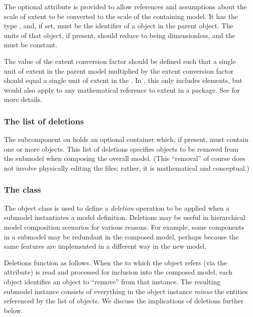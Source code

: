 The optional  attribute is provided to allow
references and assumptions about the scale of extent to be converted to 
the scale of the containing model.  It has the type ,
and, if set, must be the identifier of a \Parameter object in the 
parent \Model object.  The units of that \Parameter object, if present,
should reduce to being dimensionless, and the \Parameter must be constant.

The value of the extent conversion factor should be defined such that a
single unit of extent in the parent model multiplied by the extent conversion
factor should equal a single unit of extent in the \Submodel. 
In \sbmlthreecore, this only
includes \KineticLaw elements, but would also apply to any mathematical 
reference to extent in a package. See  for more details.


\subsubsection{The list of deletions}
\label{listofdeletions}

The  subcomponent on \Submodel holds an optional
\ListOfDeletions container which, if present, must contain one or more
\Deletion objects.  This list of deletions specifies objects to be
removed from the submodel when composing the overall model.  (This
``removal'' of course does not involve physically editing the files;
rather, it is mathematical and conceptual.)


\subsubsection{The  class}
\label{deletion-class}

The \Deletion object class is used to define a \emph{deletion} operation
to be applied when a submodel instantiates a model definition.
Deletions may be useful in hierarchical model composition scenarios for
various reasons.  For example, some components in a submodel may be
redundant in the composed model, perhaps because the same features are
implemented in a different way in the new model.

Deletions function as follows.  When the \Model to which the \Submodel
object refers (via the  attribute) is read and processed
for inclusion into the composed model, each \Deletion object identifies
an object to ``remove'' from that \Model instance.  The resulting
submodel instance consists of everything in the \Model object instance
\emph{minus} the entities referenced by the list of \Deletion objects.
We discuss the implications of deletions further below.

